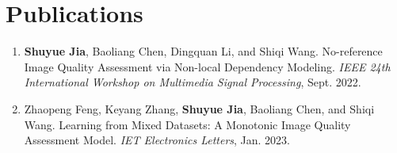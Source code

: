 \chapter{Publications}

\begin{enumerate}
	\item {\bf Shuyue Jia}, Baoliang Chen, Dingquan Li, and Shiqi Wang. No-reference Image Quality Assessment via Non-local Dependency Modeling. 
	\textit{IEEE 24th International Workshop on Multimedia Signal Processing}, Sept. 2022.
	
	\item Zhaopeng Feng, Keyang Zhang, {\bf Shuyue Jia}, Baoliang Chen, and Shiqi Wang. Learning from Mixed Datasets: A Monotonic Image Quality Assessment Model.
	\textit{IET Electronics Letters}, Jan. 2023.
	
	
\end{enumerate}